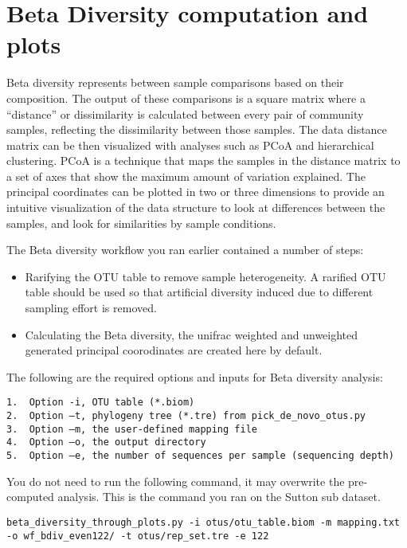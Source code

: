 \section{Beta Diversity computation and plots}

Beta diversity represents between sample comparisons based on their composition. The output of these comparisons is a square matrix where a “distance” or dissimilarity is calculated between every pair of community samples, reflecting the dissimilarity between those samples. The data distance matrix can be then visualized with analyses such as PCoA and hierarchical clustering. PCoA is a technique that maps the samples in the distance matrix to a set of axes that show the maximum amount of variation explained. The principal coordinates can be plotted in two or three dimensions to provide an intuitive visualization of the data structure to look at differences between the samples, and look for similarities by sample conditions. 

The Beta diversity workflow you ran earlier contained a number of steps: 
\begin{itemize}
  \item Rarifying the OTU table to remove sample heterogeneity. A rarified OTU table should be used so that artificial diversity induced due to different sampling effort is removed. 
  \item Calculating the Beta diversity, the unifrac weighted and unweighted generated principal coorodinates are created here by default.
\end{itemize}

The following are the required options and inputs for Beta diversity analysis:

\begin{lstlisting}
1.	Option -i, OTU table (*.biom)
2.	Option –t, phylogeny tree (*.tre) from pick_de_novo_otus.py
3.	Option –m, the user-defined mapping file 
4.	Option –o, the output directory
5.	Option –e, the number of sequences per sample (sequencing depth) 
\end{lstlisting}

You do not need to run the following command, it may overwrite the pre-computed analysis. This is the command you ran on the Sutton sub dataset.

\begin{lstlisting}
beta_diversity_through_plots.py -i otus/otu_table.biom -m mapping.txt -o wf_bdiv_even122/ -t otus/rep_set.tre -e 122
\end{lstlisting}

